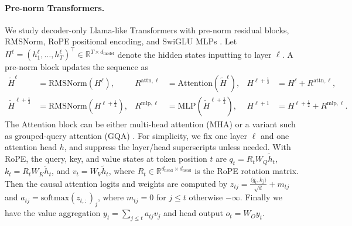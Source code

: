 \documentclass{article}
\theoremstyle{plain}
\theoremstyle{definition}
\theoremstyle{remark}
\begin{document}
\paragraph{Pre-norm Transformers.}
We study decoder-only Llama-like Transformers with pre-norm residual blocks, RMSNorm, RoPE positional encoding, and SwiGLU MLPs \citep{touvron2023llama,zhang2019rmsnorm,su2024rope,shazeer2020gluvariants}.
Let $H^\ell = (h_1^\ell,\dots,h_T^\ell)^\top \in \mathbb{R}^{T\times d_{\mathrm{model}}}$ denote the hidden states inputting to layer $\ell$.
A pre-norm block updates the sequence as
\[\begin{aligned}
    \widetilde H^\ell &= \mathrm{RMSNorm}(H^\ell), &
    R^{\mathrm{attn},\ell} &= \mathrm{Attention}(\widetilde H^\ell), &
    H^{\ell+\frac12} &= H^\ell + R^{\mathrm{attn},\ell}, \\
    \widetilde H^{\ell+\frac12} &= \mathrm{RMSNorm}(H^{\ell+\frac12}), &
    R^{\mathrm{mlp},\ell} &= \mathrm{MLP}(\widetilde H^{\ell+\frac12}), &
    H^{\ell+1} &= H^{\ell+\frac12} + R^{\mathrm{mlp},\ell}.
\end{aligned}\]
The Attention block can be either multi-head attention (MHA) \citep{vaswani2017attention} or a variant such as grouped-query attention (GQA) \citep{ainslie2023gqa}. For simplicity, we fix one layer $\ell$ and one attention head $h$, and suppress the layer/head superscripts unless needed. With RoPE, the query, key, and value states at token position $t$ are $q_t = R_t W_Q \widetilde h_t$, $k_t = R_t W_K \widetilde h_t$, and $v_t = W_V \widetilde h_t$, where $R_t\in\mathbb{R}^{d_{\mathrm{head}}\times d_{\mathrm{head}}}$ is the RoPE rotation matrix. Then the causal attention logits and weights are computed by $z_{tj}=\frac{\langle q_t,k_j\rangle}{\sqrt d}+m_{tj}$ and $a_{tj}=\mathrm{softmax}(z_{t,:})_j$, where $m_{tj}=0$ for $j\le t$ otherwise $-\infty$.
Finally we have the value aggregation $y_t = \sum_{j\le t} a_{tj} v_j$ and head output $o_t = W_O y_t$.
\end{document}
